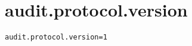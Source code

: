 \section{audit.protocol.version}
\label{configuration:AuditProtocolVersion}
\ClearAPI
\TODO
{}
\begin{lstlisting}[style=Props,caption={Usage example for \textit{audit.protocol.version}}]
audit.protocol.version=1
\end{lstlisting}